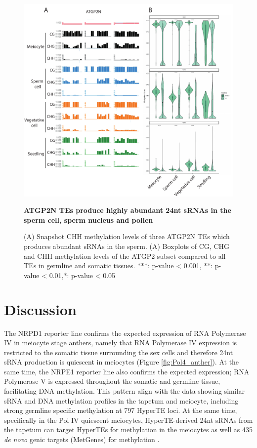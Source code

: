 \begin{figure}[htbp!] 
\centering    
    \includegraphics[width=1\textwidth]{Chapter2/Figs/Figure14_TE_methylation.pdf}
\caption{\textbf{ATGP2N TEs produce highly abundant 24nt sRNAs in the sperm cell, sperm nucleus and pollen}}
\label{fig:TE_methylation}
\captionsetup{font=small}
    \caption*{(A) Snapshot CHH methylation levels of three ATGP2N TEs which produces abundant sRNAs in the sperm. (A) Boxplots of CG, CHG and CHH methylation levels of the ATGP2 subset compared to all TEs in germline and somatic tissues. ***: p-value < 0.001, **: p-value < 0.01,*: p-value < 0.05}
\end{figure}

\clearpage

\section{Discussion}

The NRPD1 reporter line confirms the expected expression of RNA Polymerase IV in meiocyte stage anthers, namely that RNA Polymerase IV expression is restricted to the somatic tissue surrounding the sex cells and therefore 24nt sRNA production is quiescent in meiocytes (Figure \ref{fig:Pol4_anther}). At the same time, the NRPE1 reporter line also confirms the expected expression; RNA Polymerase V is expressed throughout the somatic and germline tissue, facilitating DNA methylation. This pattern align with the data showing similar sRNA and DNA methylation profiles in the tapetum and meiocyte, including strong germline specific methylation at 797 HyperTE loci. At the same time, specifically in the Pol IV quiescent meiocytes, HyperTE-derived 24nt sRNAs from the tapetum can target HyperTEs for methylation in the meiocytes as well as 435 \textit{de novo} genic targets (MetGenes) for methylation \citep{RN187,RN199}. 

